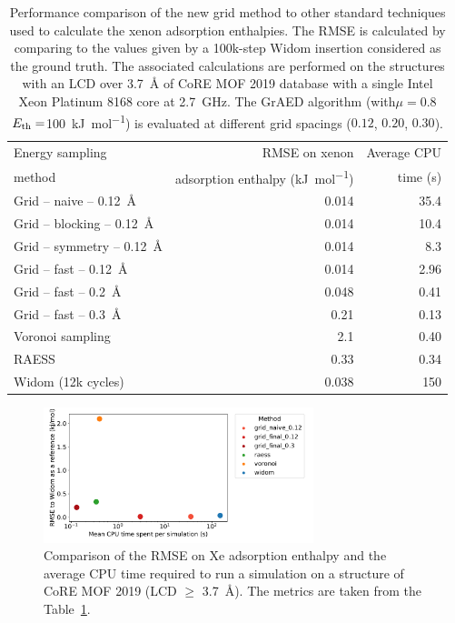 \documentclass[main]{subfiles}
\begin{document}
\setlength{\extrarowheight}{0.1cm}
\begin{table}[ht]
  \centering
  \begin{tabular}{|l|r|r|}
    \hline
    Energy sampling  & RMSE on xenon  &  Average CPU  \\
    method  & adsorption enthalpy (\si{\kilo\joule\per\mole}) &  time (s) \\[0.5mm]
    \hline
    Grid -- naive -- \SI{0.12}{\angstrom} & 0.014  &  35.4 \\[0.5mm] 
    Grid -- blocking -- \SI{0.12}{\angstrom} & 0.014  &  10.4 \\ 
    Grid -- symmetry -- \SI{0.12}{\angstrom} & 0.014  &  8.3 \\ 
    Grid -- fast -- \SI{0.12}{\angstrom} & 0.014  &  2.96 \\
    Grid -- fast -- \SI{0.2}{\angstrom} & 0.048  &  0.41 \\
    Grid -- fast -- \SI{0.3}{\angstrom} & 0.21  &  0.13 \\
    Voronoi sampling &   2.1  & 0.40 \\
    RAESS\autocite{Ren_2023} & 0.33   &  0.34 \\
    Widom\autocite{Widom1963} (12k cycles) & 0.038  &  150 \\
    \hline
  \end{tabular}
  \caption{Performance comparison of the new grid method to other standard techniques used to calculate the xenon adsorption enthalpies. The RMSE is calculated by comparing to the values given by a 100k-step Widom insertion considered as the ground truth. The associated calculations are performed on the structures with an LCD over \SI{3.7}{\angstrom} of CoRE MOF 2019 database with a single Intel Xeon Platinum 8168 core at 2.7~GHz. The GrAED algorithm (with$\mu=0.8$ $E_{\text{th}}=$\SI{100}{\kilo\joule\per\mole}) is evaluated at different grid spacings ($0.12$, $0.20$, $0.30$).}\label{tab:grid}
\end{table}


\begin{figure}[ht]
  \centering
    \includegraphics[width=0.7\textwidth]{figures/3-fastsim/Sum-up_grid.pdf}
    \caption{Comparison of the RMSE on Xe adsorption enthalpy and the average CPU time required to run a simulation on a structure of CoRE MOF 2019 (LCD $\geq$ \SI{3.7}{\angstrom}). The metrics are taken from the Table~\ref{tab:grid}. }\label{fgr:grid_perfomance}
\end{figure}
\end{document}
